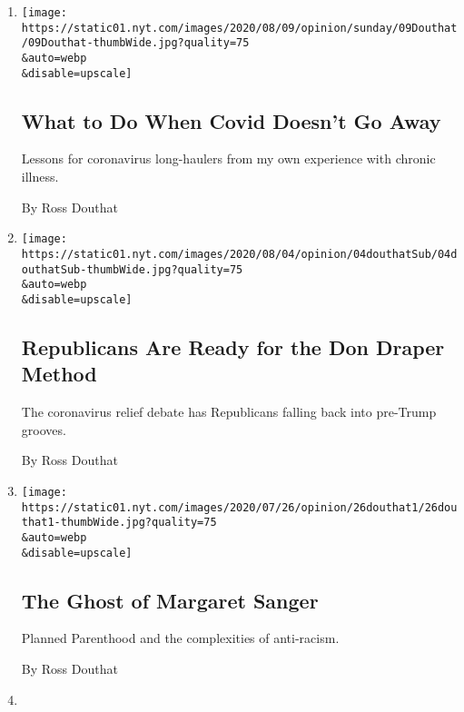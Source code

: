 \begin{enumerate}
\def\labelenumi{\arabic{enumi}.}
\item
  \href{/2020/08/08/opinion/sunday/covid-lyme-treatment-medicine.html}{}

  \texttt{[image: https://static01.nyt.com/images/2020/08/09/opinion/sunday/09Douthat/09Douthat-thumbWide.jpg?quality=75\\\&auto=webp\\\&disable=upscale]}

  \hypertarget{what-to-do-when-covid-doesnt-go-away}{%
  \subsection{What to Do When Covid Doesn't Go
  Away}\label{what-to-do-when-covid-doesnt-go-away}}

  Lessons for coronavirus long-haulers from my own experience with
  chronic illness.

  By Ross Douthat
\item
  \href{/2020/08/04/opinion/trump-republicans-tea-party.html}{}

  \texttt{[image: https://static01.nyt.com/images/2020/08/04/opinion/04douthatSub/04douthatSub-thumbWide.jpg?quality=75\\\&auto=webp\\\&disable=upscale]}

  \hypertarget{republicans-are-ready-for-the-don-draper-method}{%
  \subsection{Republicans Are Ready for the Don Draper
  Method}\label{republicans-are-ready-for-the-don-draper-method}}

  The coronavirus relief debate has Republicans falling back into
  pre-Trump grooves.

  By Ross Douthat
\item
  \href{/2020/07/25/opinion/sunday/abortion-racism-margaret-sanger.html}{}

  \texttt{[image: https://static01.nyt.com/images/2020/07/26/opinion/26douthat1/26douthat1-thumbWide.jpg?quality=75\\\&auto=webp\\\&disable=upscale]}

  \hypertarget{the-ghost-of-margaret-sanger}{%
  \subsection{The Ghost of Margaret
  Sanger}\label{the-ghost-of-margaret-sanger}}

  Planned Parenthood and the complexities of anti-racism.

  By Ross Douthat
\item
  \href{/2020/07/21/opinion/trump-polls-election-2020.html}{}


\end{enumerate}
